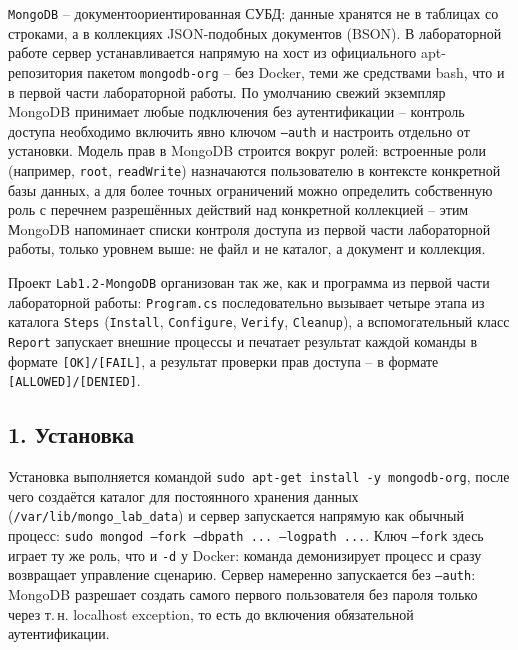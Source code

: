 

\texttt{MongoDB} -- документоориентированная СУБД: данные хранятся не в
таблицах со строками, а в коллекциях JSON-подобных документов (BSON).
В лабораторной работе сервер устанавливается напрямую на хост из
официального apt-репозитория пакетом \texttt{mongodb-org} -- без Docker,
теми же средствами bash, что и в первой части лабораторной работы.
По умолчанию свежий экземпляр MongoDB принимает любые
подключения без аутентификации -- контроль доступа необходимо включить
явно ключом \texttt{--auth} и настроить отдельно от установки. Модель прав
в MongoDB строится вокруг ролей: встроенные роли (например,
\texttt{root}, \texttt{readWrite}) назначаются пользователю в контексте
конкретной базы данных, а для более точных ограничений можно определить
собственную роль с перечнем разрешённых действий над конкретной
коллекцией -- этим МongoDB напоминает списки контроля доступа из первой
части лабораторной работы, только уровнем выше: не файл и не каталог, а
документ и коллекция.


Проект \texttt{Lab1.2-MongoDB} организован так же, как и программа из
первой части лабораторной работы: \texttt{Program.cs} последовательно
вызывает четыре этапа из каталога \texttt{Steps} (\texttt{Install},
\texttt{Configure}, \texttt{Verify}, \texttt{Cleanup}), а вспомогательный
класс \texttt{Report} запускает внешние процессы и печатает результат
каждой команды в формате \texttt{[OK]/[FAIL]}, а результат проверки прав
доступа -- в формате \texttt{[ALLOWED]/[DENIED]}.

\subsection*{1. Установка}

Установка выполняется командой \texttt{sudo apt-get install -y
mongodb-org}, после чего создаётся каталог для постоянного хранения
данных (\texttt{/var/lib/mongo\_lab\_data}) и сервер запускается напрямую
как обычный процесс: \texttt{sudo mongod --fork --dbpath ... --logpath
...}. Ключ \texttt{--fork} здесь играет ту же роль, что и \texttt{-d} у
Docker: команда демонизирует процесс и сразу возвращает управление
сценарию. Сервер намеренно запускается без \texttt{--auth}: MongoDB
разрешает создать самого первого пользователя без пароля только через
т.\,н. localhost exception, то есть до включения обязательной
аутентификации.

